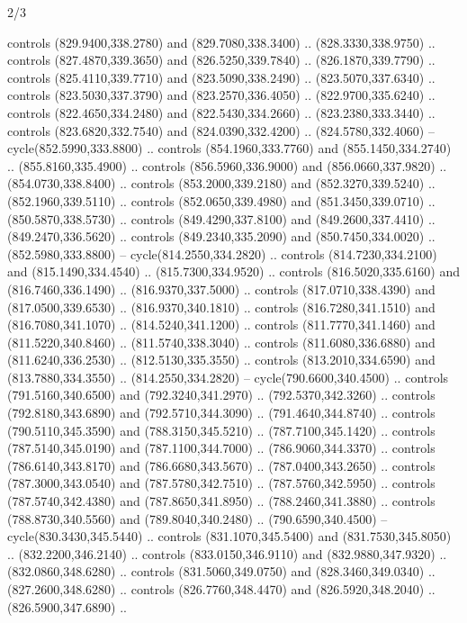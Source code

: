 \begin{flagdescription}{2/3}
\begin{scope}[xshift=\flaglength/2,yshift=\flagwidth/2,scale=\flagwidth/341]
\begin{scope}[xshift=-20mm,yshift=38.3mm,scale=0.1565]
\begin{scope}[y=0.80pt, x=0.80pt, yscale=-1, xscale=1,draw=gold,fill=white]
\begin{scope}[line join=round,line cap=round,line width=1.016\lw]
\begin{scope}[fill]
  controls (829.9400,338.2780) and (829.7080,338.3400) .. (828.3330,338.9750) ..
  controls (827.4870,339.3650) and (826.5250,339.7840) .. (826.1870,339.7790) ..
  controls (825.4110,339.7710) and (823.5090,338.2490) .. (823.5070,337.6340) ..
  controls (823.5030,337.3790) and (823.2570,336.4050) .. (822.9700,335.6240) ..
  controls (822.4650,334.2480) and (822.5430,334.2660) .. (823.2380,333.3440) ..
  controls (823.6820,332.7540) and (824.0390,332.4200) .. (824.5780,332.4060) --
  cycle(852.5990,333.8800) .. controls (854.1960,333.7760) and
  (855.1450,334.2740) .. (855.8160,335.4900) .. controls (856.5960,336.9000) and
  (856.0660,337.9820) .. (854.0730,338.8400) .. controls (853.2000,339.2180) and
  (852.3270,339.5240) .. (852.1960,339.5110) .. controls (852.0650,339.4980) and
  (851.3450,339.0710) .. (850.5870,338.5730) .. controls (849.4290,337.8100) and
  (849.2600,337.4410) .. (849.2470,336.5620) .. controls (849.2340,335.2090) and
  (850.7450,334.0020) .. (852.5980,333.8800) -- cycle(814.2550,334.2820) ..
  controls (814.7230,334.2100) and (815.1490,334.4540) .. (815.7300,334.9520) ..
  controls (816.5020,335.6160) and (816.7460,336.1490) .. (816.9370,337.5000) ..
  controls (817.0710,338.4390) and (817.0500,339.6530) .. (816.9370,340.1810) ..
  controls (816.7280,341.1510) and (816.7080,341.1070) .. (814.5240,341.1200) ..
  controls (811.7770,341.1460) and (811.5220,340.8460) .. (811.5740,338.3040) ..
  controls (811.6080,336.6880) and (811.6240,336.2530) .. (812.5130,335.3550) ..
  controls (813.2010,334.6590) and (813.7880,334.3550) .. (814.2550,334.2820) --
  cycle(790.6600,340.4500) .. controls (791.5160,340.6500) and
  (792.3240,341.2970) .. (792.5370,342.3260) .. controls (792.8180,343.6890) and
  (792.5710,344.3090) .. (791.4640,344.8740) .. controls (790.5110,345.3590) and
  (788.3150,345.5210) .. (787.7100,345.1420) .. controls (787.5140,345.0190) and
  (787.1100,344.7000) .. (786.9060,344.3370) .. controls (786.6140,343.8170) and
  (786.6680,343.5670) .. (787.0400,343.2650) .. controls (787.3000,343.0540) and
  (787.5780,342.7510) .. (787.5760,342.5950) .. controls (787.5740,342.4380) and
  (787.8650,341.8950) .. (788.2460,341.3880) .. controls (788.8730,340.5560) and
  (789.8040,340.2480) .. (790.6590,340.4500) -- cycle(830.3430,345.5440) ..
  controls (831.1070,345.5400) and (831.7530,345.8050) .. (832.2200,346.2140) ..
  controls (833.0150,346.9110) and (832.9880,347.9320) .. (832.0860,348.6280) ..
  controls (831.5060,349.0750) and (828.3460,349.0340) .. (827.2600,348.6280) ..
  controls (826.7760,348.4470) and (826.5920,348.2040) .. (826.5900,347.6890) ..

\end{scope}
\end{scope}
\end{scope}
\end{scope}
\end{scope}
\end{flagdescription}
